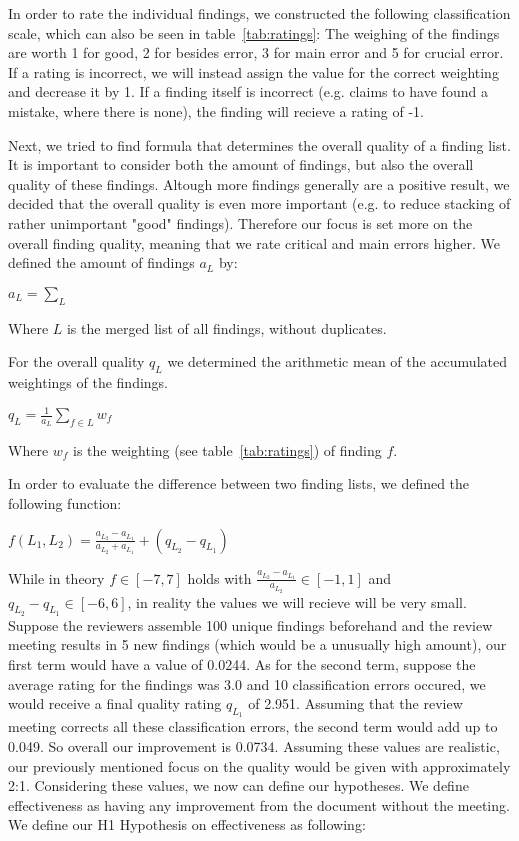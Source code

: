 In order to rate the individual findings, we constructed the following classification scale, which can also be seen in table~\ref{tab:ratings}:
The weighing of the findings are worth 1 for good, 2 for besides error, 3 for main error and 5 for crucial error. If a rating is incorrect, we will instead assign the value for the correct weighting and decrease it by 1.
If a finding itself is incorrect (e.g. claims to have found a mistake, where there is none), the finding will recieve a rating of -1.

Next, we tried to find formula that determines the overall quality of a finding list. It is important to consider both the amount of findings, but also the overall quality of these findings. Altough more findings generally are a positive result, we decided that the overall quality is even more important (e.g. to reduce stacking of rather unimportant "good" findings). Therefore our focus is set more on the overall finding quality, meaning that we rate critical and main errors higher.
We defined the amount of findings $a_L$ by:
\begin{center}

$a_L = \sum_{L}$
\end{center}

Where $L$ is the merged list of all findings, without duplicates.

For the overall quality $q_L$ we determined the arithmetic mean of the accumulated weightings of the findings.

\begin{center}
{$q_L = \frac{1}{a_L} \sum_{f \in L} w_f$}
\end{center}

Where $w_f$ is the weighting (see table~\ref{tab:ratings}) of finding $f$.

In order to evaluate the difference between two finding lists, we defined the following function:

\begin{center}
$f(L_1, L_2) = \frac{a_{L_2} - a_{L_1}}{a_{L_2} + a_{L_1}} + (q_{L_2} - q_{L_1}) $
\end{center}

While in theory $f \in [-7, 7]$ holds with $\frac{a_{L_2} - a_{L_1}}{a_{L_2}} \in [-1, 1]$ and $q_{L_2} - q_{L_1} \in [-6, 6]$, in reality the values we will recieve will be very small. Suppose the reviewers assemble 100 unique findings beforehand and the review meeting results in 5 new findings (which would be a unusually high amount), our first term
would have a value of 0.0244.
As for the second term, suppose the average rating for the findings was 3.0 and 10 classification errors occured, we would receive a final quality rating $q_{L_1}$ of 2.951. Assuming that the review meeting corrects all these classification errors, the second term would add up to 0.049. So overall our improvement is 0.0734. Assuming these values are realistic, our previously mentioned focus on the quality would be given with approximately 2:1.
Considering these values, we now can define our hypotheses.
We define effectiveness as having any improvement from the document without the meeting.
We define our H1 Hypothesis on effectiveness as following:

